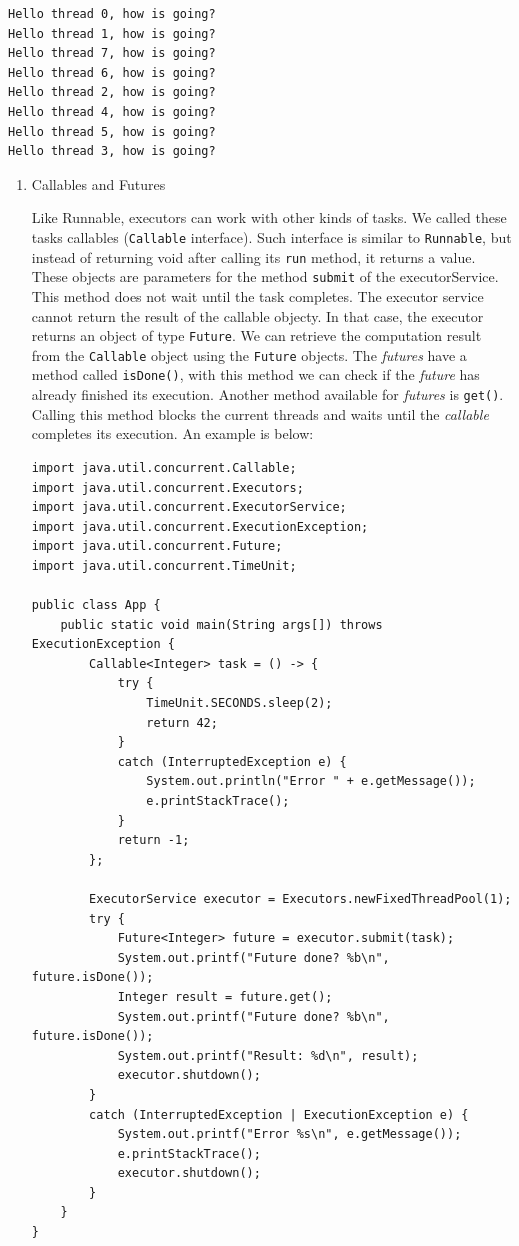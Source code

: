 \documentclass{latex/classes/thesis}
\begin{document}
\begin{verbatim}
Hello thread 0, how is going?
Hello thread 1, how is going?
Hello thread 7, how is going?
Hello thread 6, how is going?
Hello thread 2, how is going?
Hello thread 4, how is going?
Hello thread 5, how is going?
Hello thread 3, how is going?
\end{verbatim}

\begin{enumerate}
\item Callables and Futures
\label{sec:org7e10aa2}

Like Runnable, executors can work with other kinds of tasks. We called these
tasks callables (\texttt{Callable} interface). Such interface is similar to \texttt{Runnable},
but instead of returning void after calling its \texttt{run} method, it returns a
value. These objects are parameters for the method \texttt{submit} of the
executorService. This method does not wait until the task completes. The
executor service cannot return the result of the callable objecty. In that
case, the executor returns an object of type \texttt{Future}. We can retrieve the
computation result from the \texttt{Callable} object using the \texttt{Future} objects. The
\emph{futures} have a method called \texttt{isDone()}, with this method we can check if the
\emph{future} has already finished its execution. Another method available for
\emph{futures} is \texttt{get()}. Calling this method blocks the current threads and waits
until the \emph{callable} completes its execution. An example is below:


\begin{lstlisting}
import java.util.concurrent.Callable;
import java.util.concurrent.Executors;
import java.util.concurrent.ExecutorService;
import java.util.concurrent.ExecutionException;
import java.util.concurrent.Future;
import java.util.concurrent.TimeUnit;

public class App {
    public static void main(String args[]) throws ExecutionException {
        Callable<Integer> task = () -> {
            try {
                TimeUnit.SECONDS.sleep(2);
                return 42;
            }
            catch (InterruptedException e) {
                System.out.println("Error " + e.getMessage());
                e.printStackTrace();
            }
            return -1;
        };

        ExecutorService executor = Executors.newFixedThreadPool(1);
        try {
            Future<Integer> future = executor.submit(task);
            System.out.printf("Future done? %b\n", future.isDone());
            Integer result = future.get();
            System.out.printf("Future done? %b\n", future.isDone());
            System.out.printf("Result: %d\n", result);
            executor.shutdown();
        }
        catch (InterruptedException | ExecutionException e) {
            System.out.printf("Error %s\n", e.getMessage());
            e.printStackTrace();
            executor.shutdown();
        }
    }
}
\end{lstlisting}


\end{enumerate}
\end{document}
